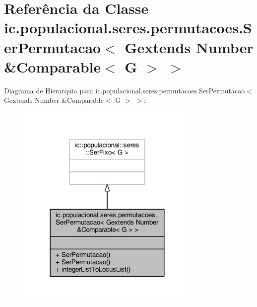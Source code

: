 \hypertarget{classic_1_1populacional_1_1seres_1_1permutacoes_1_1_ser_permutacao_3_01_gextends_01_number_01_6_comparable_3_01_g_01_4_01_4}{\section{Referência da Classe ic.\-populacional.\-seres.\-permutacoes.\-Ser\-Permutacao$<$ Gextends Number \&Comparable$<$ G $>$ $>$}
\label{classic_1_1populacional_1_1seres_1_1permutacoes_1_1_ser_permutacao_3_01_gextends_01_number_01_6_comparable_3_01_g_01_4_01_4}
}


Diagrama de Hierarquia para ic.\-populacional.\-seres.\-permutacoes.\-Ser\-Permutacao$<$ Gextends Number \&Comparable$<$ G $>$ $>$\-:
\nopagebreak
\begin{figure}[H]
\begin{center}
\leavevmode
\includegraphics[width=252pt]{classic_1_1populacional_1_1seres_1_1permutacoes_1_1_ser_permutacao_3_01_gextends_01_number_01_6_0319bd69d5b3a31fc188d324ef164e1e}
\end{center}
\end{figure}


